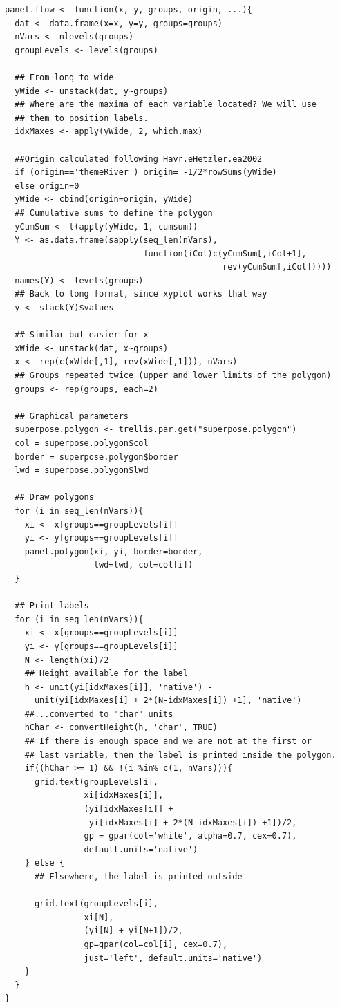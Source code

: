 \documentclass[smallroyalvopaper]{memoir}
\begin{document}
\lstset{language=R,numbers=none}
\begin{lstlisting}
panel.flow <- function(x, y, groups, origin, ...){
  dat <- data.frame(x=x, y=y, groups=groups)
  nVars <- nlevels(groups)
  groupLevels <- levels(groups)

  ## From long to wide
  yWide <- unstack(dat, y~groups)
  ## Where are the maxima of each variable located? We will use
  ## them to position labels.
  idxMaxes <- apply(yWide, 2, which.max)

  ##Origin calculated following Havr.eHetzler.ea2002
  if (origin=='themeRiver') origin= -1/2*rowSums(yWide)
  else origin=0 
  yWide <- cbind(origin=origin, yWide)
  ## Cumulative sums to define the polygon
  yCumSum <- t(apply(yWide, 1, cumsum))
  Y <- as.data.frame(sapply(seq_len(nVars),
                            function(iCol)c(yCumSum[,iCol+1],
                                            rev(yCumSum[,iCol]))))
  names(Y) <- levels(groups)
  ## Back to long format, since xyplot works that way
  y <- stack(Y)$values

  ## Similar but easier for x
  xWide <- unstack(dat, x~groups)
  x <- rep(c(xWide[,1], rev(xWide[,1])), nVars)
  ## Groups repeated twice (upper and lower limits of the polygon)
  groups <- rep(groups, each=2)

  ## Graphical parameters
  superpose.polygon <- trellis.par.get("superpose.polygon")
  col = superpose.polygon$col
  border = superpose.polygon$border 
  lwd = superpose.polygon$lwd 

  ## Draw polygons
  for (i in seq_len(nVars)){
    xi <- x[groups==groupLevels[i]]
    yi <- y[groups==groupLevels[i]]
    panel.polygon(xi, yi, border=border,
                  lwd=lwd, col=col[i])
  }

  ## Print labels
  for (i in seq_len(nVars)){
    xi <- x[groups==groupLevels[i]]
    yi <- y[groups==groupLevels[i]]
    N <- length(xi)/2
    ## Height available for the label
    h <- unit(yi[idxMaxes[i]], 'native') -
      unit(yi[idxMaxes[i] + 2*(N-idxMaxes[i]) +1], 'native')
    ##...converted to "char" units
    hChar <- convertHeight(h, 'char', TRUE)
    ## If there is enough space and we are not at the first or
    ## last variable, then the label is printed inside the polygon.
    if((hChar >= 1) && !(i %in% c(1, nVars))){
      grid.text(groupLevels[i],
                xi[idxMaxes[i]],
                (yi[idxMaxes[i]] +
                 yi[idxMaxes[i] + 2*(N-idxMaxes[i]) +1])/2,
                gp = gpar(col='white', alpha=0.7, cex=0.7),
                default.units='native')
    } else {
      ## Elsewhere, the label is printed outside

      grid.text(groupLevels[i],
                xi[N],
                (yi[N] + yi[N+1])/2,
                gp=gpar(col=col[i], cex=0.7),
                just='left', default.units='native')
    }          
  }
}
\end{lstlisting}
\end{document}
